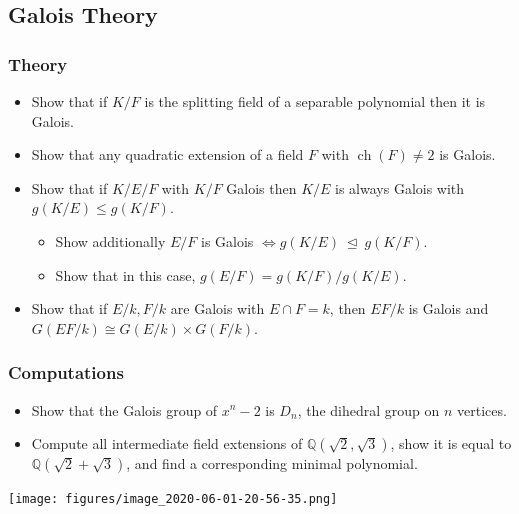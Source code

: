 \hypertarget{galois-theory-1}{%
\subsection{Galois Theory}\label{galois-theory-1}}

\hypertarget{theory}{%
\subsubsection{Theory}\label{theory}}

\begin{itemize}
\tightlist
\item
  Show that if \(K/F\) is the splitting field of a separable polynomial
  then it is Galois.
\item
  Show that any quadratic extension of a field \(F\) with
  \(\operatorname{ch}(F)\neq 2\) is Galois.
\item
  Show that if \(K/E/F\) with \(K/F\) Galois then \(K/E\) is always
  Galois with \(g(K/E) \leq g(K/F)\).

  \begin{itemize}
  \tightlist
  \item
    Show additionally \(E/F\) is Galois
    \(\iff g(K/E) {~\trianglelefteq~}g(K/F)\).
  \item
    Show that in this case, \(g(E/F) = g(K/F) / g(K/E)\).
  \end{itemize}
\item
  Show that if \(E/k, F/k\) are Galois with \(E\cap F = k\), then
  \(EF/k\) is Galois and \(G(EF/k) \cong G(E/k)\times G(F/k)\).
\end{itemize}

\hypertarget{computations}{%
\subsubsection{Computations}\label{computations}}

\begin{itemize}
\tightlist
\item
  Show that the Galois group of \(x^n - 2\) is \(D_n\), the dihedral
  group on \(n\) vertices.
\item
  Compute all intermediate field extensions of
  \({\mathbb{Q}}(\sqrt 2, \sqrt 3)\), show it is equal to
  \({\mathbb{Q}}(\sqrt 2 + \sqrt 3)\), and find a corresponding minimal
  polynomial.
\end{itemize}

\texttt{[image: figures/image\_2020-06-01-20-56-35.png]}

